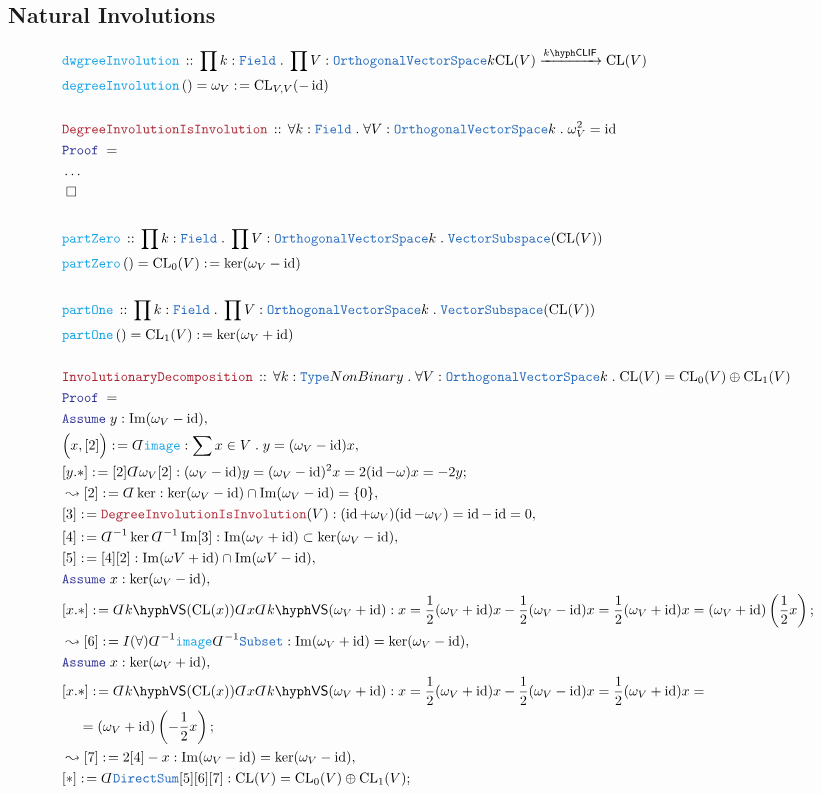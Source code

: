 \documentclass[12pt]{scrartcl}%
\newcommand{\TYPE}[1]{\textcolor{NavyBlue}{\mathtt{#1}}}%
\newcommand{\FUNC}[1]{\textcolor{Cerulean}{\mathtt{#1}}}%
\newcommand{\LOGIC}[1]{\textcolor{Blue}{\mathtt{#1}}}%
\newcommand{\THM}[1]{\textcolor{Maroon}{\mathtt{#1}}}%
\renewcommand{\.}{\; . \;} %
\newcommand{\de}{: \kern 0.1pc =} %
\newcommand{\Act}[1]{\left( #1 \right)} %
\newcommand{\Theorem}[2]{& \THM{#1} \, :: \, #2 \\ & \Proof = \\ } %
\newcommand{\DeclareFunc}[2]{& \FUNC{#1} \, :: \, #2 \\}%
\newcommand{\DefineNamedFunc}[4]{&  \FUNC{#1}\Act{#2} = #3 \de #4 \\}%
\newcommand{\NewLine}{\\ & \kern 1pc}%
\newcommand{\Page}[1]{ \begin{align*} #1 \end{align*}  }%
\newcommand{ \bd }{ \ByDef }%
\newcommand{\NoProof}{ & \ldots \\ \EndProof}%
\newcommand{\Type}{\TYPE{Type}}%
\DeclareMathOperator*{\id}{id}%
\DeclareMathOperator*{\im}{Im}%
\newcommand{\Say}[3]{& #1 \de #2 : #3, \\} %
\newcommand{\Conclude}[3]{& #1 \de #2 : #3; \\}%
\newcommand{\Derive}[3]{& \leadsto #1 \de #2 : #3, \\} %
\newcommand{\Assume}[2]{& \LOGIC{Assume} \; #1 : #2, \\} %
\newcommand{\QED}{\; \square} %
\newcommand{\EndProof}{& \QED \\} %
\newcommand{\ByDef}{\rotatebox[origin=c]{-180}{$D$}}%
\newcommand{\Proof}{\LOGIC{Proof} \; } %
\newcommand{\Arrow}[1]{\xrightarrow{#1}}%
\newcommand{\OVS}{\TYPE{OrthogonalVectorSpace}}
\newcommand{\VS}[1]{#1\hyph\mathsf{VS}} %
\newcommand{\Field}{\TYPE{Field}}
\newcommand{\CLIF}[1]{#1\hyph\mathsf{CLIF}}%
\begin{document}
\subsection{Natural Involutions}
\Page{	
	\DeclareFunc{dwgreeInvolution}{
		\prod k : \Field \. \prod V : \OVS{k}
		\mathrm{CL}(V) \Arrow{\CLIF{k}} \mathrm{CL}(V)
	}
	\DefineNamedFunc{degreeInvolution}{}{\omega_V}{\mathrm{CL}_{V,V}(-\id)} 
	\\
	\Theorem{DegreeInvolutionIsInvolution}
	{
		\forall k : \Field \.
		\forall V : \OVS{k} \.
		\omega_V^2 = \id
	}
	\NoProof
	\\
	\DeclareFunc{partZero}{
		\prod k : \Field \. \prod V : \OVS{k} \.
		\TYPE{VectorSubspace}(\mathrm{CL}(V))
	}
	\DefineNamedFunc{partZero}{}{\mathrm{CL}_0(V)}{\ker(\omega_V - \id)}
	\\
	\DeclareFunc{partOne}{
		\prod k : \Field \. \prod V : \OVS{k} \.
		\TYPE{VectorSubspace}(\mathrm{CL}(V))
	}
	\DefineNamedFunc{partOne}{}{\mathrm{CL}_1(V)}{\ker(\omega_V + \id)}
	\\
	\Theorem{InvolutionaryDecomposition}
	{
		\forall k : \Type{NonBinary} \.
		\forall V : \OVS{k} \.
		\mathrm{CL}(V) = \mathrm{CL}_0(V) \oplus \mathrm{CL}_1(V)
	}
	\Assume{y}{\im(\omega_V - \id)} 
	\Say{\Big(x, [2] \Big)}{\bd \FUNC{image}}
	{ \sum x \in V \. y = (\omega_V - \id)x}
	\Conclude{[y.*]}{[2]\bd \omega_V[2]}
	{
		(\omega_V - \id)y = 
		(\omega_V - \id)^2 x =
		2(\id - \omega) x = -2y
	}
	\Derive{[2]}{\bd \ker}{\ker (\omega_V - \id) \cap \im (\omega_V - \id) = \{0\}}
	\Say{[3]}{\THM{DegreeInvolutionIsInvolution}(V)}{(\id + \omega_V)(\id - \omega_V) = \id - \id = 0}
	\Say{[4]}{ \bd^{-1} \ker \bd^{-1} \im [3]}{\im (\omega_V + \id) \subset \ker (\omega_V -\id)}
	\Say{[5]}{[4][2]}{ \im (\omega V + \id) \cap \im (\omega V - \id)}
	\Assume{x}{\ker (\omega_V -\id)}
	\Conclude{[x.*]}{ \bd \VS{k}(\mathrm{CL}(x))\bd x \bd \VS{k}(\omega_V + \id)   }
	{
		x = \frac{1}{2}(\omega_V + \id)x - \frac{1}{2}(\omega_V - \id)x 
		= \frac{1}{2}(\omega_V + \id)x = (\omega_V +\id)\left(\frac{1}{2}x\right)
	}
	\Derive{[6]}{I(\forall)\bd^{-1}\FUNC{image}\bd^{-1}\TYPE{Subset}}{\im (\omega_V + \id) = \ker (\omega_V - \id)} 
	\Assume{x}{\ker (\omega_V + \id)}
	\Conclude{[x.*]}{ \bd \VS{k}(\mathrm{CL}(x))\bd x \bd \VS{k}(\omega_V + \id)   }
	{
		x = \frac{1}{2}(\omega_V + \id)x - \frac{1}{2}(\omega_V - \id)x  
		= \frac{1}{2}(\omega_V + \id)x = \NewLine = (\omega_V +\id)\left(-\frac{1}{2}x\right)
	}
	\Derive{[7]}{2[4] - x}{\im (\omega_V - \id) = \ker (\omega_V - \id)} 
	\Conclude{[*]}{\bd \TYPE{DirectSum}[5][6][7]}
	{ \mathrm{CL}(V) = \mathrm{CL}_0(V) \oplus \mathrm{CL}_1(V)} 
}
\end{document}
